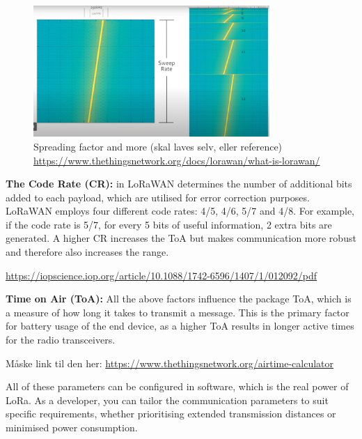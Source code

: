 \begin{figure}[H]
    \centering
    \includegraphics[width=0.8\textwidth]{figures/sweep_rate.png}
    \caption{Spreading factor and more (skal laves selv, eller reference) \url{https://www.thethingsnetwork.org/docs/lorawan/what-is-lorawan/}}
    \label{fig:spread_rate}
\end{figure}

\textbf{The Code Rate (CR):} in \ac{LoRaWAN} determines the number of additional bits added to each payload, which are utilised for error correction purposes. \ac{LoRaWAN} employs four different code rates: 4/5, 4/6, 5/7 and 4/8.
For example, if the code rate is 5/7, for every 5 bits of useful information, 2 extra bits are generated. A higher CR increases the \ac{ToA} but makes communication more robust and therefore also increases the range.

\url{https://iopscience.iop.org/article/10.1088/1742-6596/1407/1/012092/pdf}

\textbf{Time on Air (ToA):} All the above factors influence the package \ac{ToA}, which is a measure of how long it takes to transmit a message. This is the primary factor for battery usage of the end device, as a higher \ac{ToA} results in longer active times for the radio transceivers.

Måske link til den her: \url{https://www.thethingsnetwork.org/airtime-calculator}

All of these parameters can be configured in software, which is the real power of LoRa. As a developer, you can tailor the communication parameters to suit specific requirements, whether prioritising extended transmission distances or minimised power consumption.

